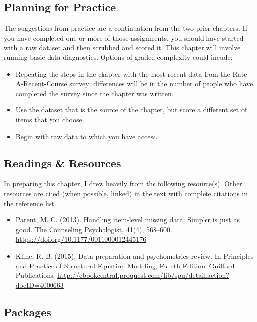 \documentclass[
]{book}
\providecommand{\tightlist}{%
  \setlength{\itemsep}{0pt}\setlength{\parskip}{0pt}}
\begin{document}
\hypertarget{planning-for-practice-2}{%
\subsection{Planning for Practice}\label{planning-for-practice-2}}

The suggestions from practice are a continuation from the two prior chapters. If you have completed one or more of those assignments, you should have started with a raw dataset and then scrubbed and scored it. This chapter will involve running basic data diagnostics. Options of graded complexity could incude:

\begin{itemize}
\tightlist
\item
  Repeating the steps in the chapter with the most recent data from the Rate-A-Recent-Course survey; differences will be in the number of people who have completed the survey since the chapter was written.
\item
  Use the dataset that is the source of the chapter, but score a different set of items that you choose.
\item
  Begin with raw data to which you have access.
\end{itemize}

\hypertarget{readings-resources-2}{%
\subsection{Readings \& Resources}\label{readings-resources-2}}

In preparing this chapter, I drew heavily from the following resource(s). Other resources are cited (when possible, linked) in the text with complete citations in the reference list.

\begin{itemize}
\item
  Parent, M. C. (2013). Handling item-level missing data: Simpler is just as good. The Counseling Psychologist, 41(4), 568--600. \url{https://doi.org/10.1177/0011000012445176}
\item
  Kline, R. B. (2015). Data preparation and psychometrics review. In Principles and Practice of Structural Equation Modeling, Fourth Edition. Guilford Publications. \url{http://ebookcentral.proquest.com/lib/spu/detail.action?docID=4000663}
\end{itemize}

\hypertarget{packages-3}{%
\subsection{Packages}\label{packages-3}}
\end{document}
